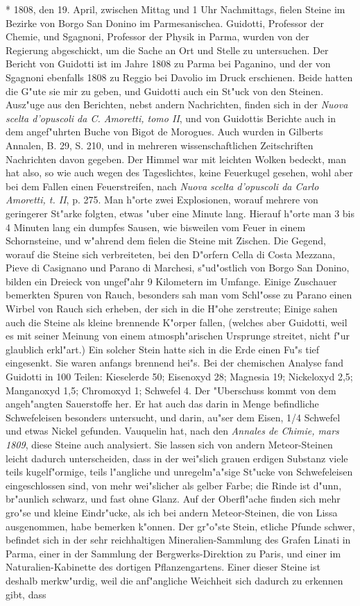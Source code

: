 \documentclass[a4paper, 11pt, oneside, polutonikogreek, german]{article}
\begin{document}
* 1808, den 19. April, zwischen Mittag und 1 Uhr Nachmittags, fielen Steine im Bezirke von Borgo San Donino im Parmesanischea. Guidotti, Professor der Chemie, und Sgagnoni, Professor der Physik in Parma, wurden von der Regierung abgeschickt, um die Sache an Ort und Stelle zu untersuchen. Der Bericht von Guidotti ist im Jahre 1808 zu Parma bei Paganino, und der von Sgagnoni ebenfalls 1808 zu Reggio bei Davolio im Druck erschienen. Beide hatten die G"ute sie mir zu geben, und Guidotti auch ein St"uck von den Steinen. Ausz"uge aus den Berichten, nebst andern Nachrichten, finden sich in der \emph{Nuova scelta d'opuscoli da C. Amoretti, tomo II}, und von Guidottis Berichte auch in dem angef"uhrten Buche von Bigot de Morogues. Auch wurden in Gilberts Annalen, B. 29, S. 210, und in mehreren wissenschaftlichen Zeitschriften Nachrichten davon gegeben. Der Himmel war mit leichten Wolken bedeckt, man hat also, so wie auch wegen des Tageslichtes, keine Feuerkugel gesehen, wohl aber bei dem Fallen einen Feuerstreifen, nach \emph{Nuova scelta d'opuscoli da Carlo Amoretti, t. II}, p. 275. Man h"orte zwei Explosionen, worauf mehrere von geringerer St"arke folgten, etwas "uber eine Minute lang. Hierauf h"orte man 3 bis 4 Minuten lang ein dumpfes Sausen, wie bisweilen vom Feuer in einem Schornsteine, und w"ahrend dem fielen die Steine mit Zischen. Die Gegend, worauf die Steine sich verbreiteten, bei den D"orfern Cella di Costa Mezzana, Pieve di Casignano und Parano di Marchesi, s"ud"ostlich von Borgo San Donino, bilden ein Dreieck von ungef"ahr 9 Kilometern im Umfange. Einige Zuschauer bemerkten Spuren von Rauch, besonders sah man vom Schl"osse zu Parano einen Wirbel von Rauch sich erheben, der sich in die H"ohe zerstreute; Einige sahen auch die Steine als kleine brennende K"orper fallen, (welches aber Guidotti, weil es mit seiner Meinung von einem atmosph"arischen Ursprunge streitet, nicht f"ur glaublich erkl"art.) Ein solcher Stein hatte sich in die Erde einen Fu"s tief eingesenkt. Sie waren anfangs brennend hei"s. Bei der chemischen Analyse fand Guidotti in 100 Teilen: Kieselerde 50; Eisenoxyd 28; Magnesia 19; Nickeloxyd 2,5; Manganoxyd 1,5; Chromoxyd 1; Schwefel 4. Der "Uberschuss kommt von dem angeh"angten Sauerstoffe her. Er hat auch das darin in Menge befindliche Schwefeleisen besonders untersucht, und darin, au"ser dem Eisen, 1/4 Schwefel und etwas Nickel gefunden. Vauquelin hat, nach den \emph{Annales de Chimie, mars 1809}, diese Steine auch analysiert. Sie lassen sich von andern Meteor-Steinen leicht dadurch unterscheiden, dass in der wei"slich grauen erdigen Substanz viele teils kugelf"ormige, teils l"angliche und unregelm"a"sige St"ucke von Schwefeleisen eingeschlossen sind, von mehr wei"slicher als gelber Farbe; die Rinde ist d"unn, br"aunlich schwarz, und fast ohne Glanz. Auf der Oberfl"ache finden sich mehr gro"se und kleine Eindr"ucke, als ich bei andern Meteor-Steinen, die von Lissa ausgenommen, habe bemerken k"onnen. Der gr"o"ste Stein, etliche Pfunde schwer, befindet sich in der sehr reichhaltigen Mineralien-Sammlung des Grafen Linati in Parma, einer in der Sammlung der Bergwerks-Direktion zu Paris, und einer im Naturalien-Kabinette des dortigen Pflanzengartens. Einer dieser Steine ist deshalb merkw"urdig, weil die anf"angliche Weichheit sich dadurch zu erkennen gibt, dass 
\end{document}

